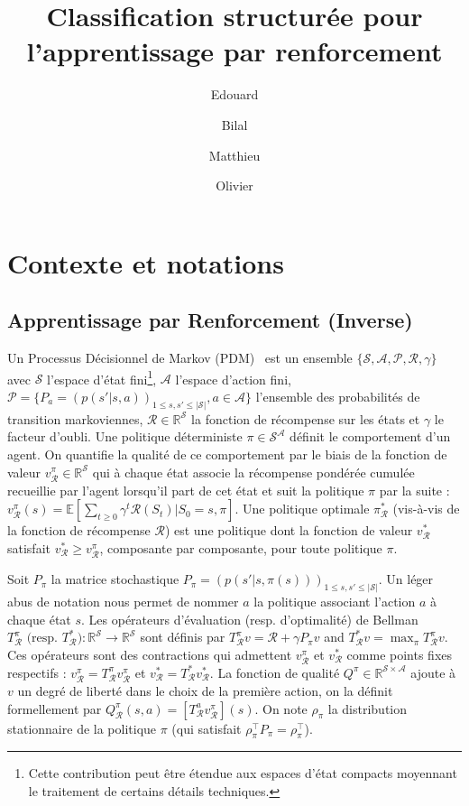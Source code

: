 \documentclass[english,utf8]{./hermes-journal}
\title[SCIRL]{Classification structurée pour l'apprentissage par renforcement}
\author[1,2]{Edouard}{Klein}
\author[2]{Bilal}{Piot}
\author[2,3]{Matthieu}{Geist}
\author[2,3]{Olivier}{Pietquin}
\newcommand{\p}{\mathcal{P}}
\newcommand{\R}{\mathcal{R}}
\newcommand{\s}{\mathcal{S}}
\newcommand{\A}{\mathcal{A}}
\newcommand{\E}{\mathbb{E}}
\begin{document}
\newtheorem{prop}[theorem]{Proposition}
\maketitle

\newpage

\section{Contexte et notations}
\label{sec:background}

\subsection{Apprentissage par Renforcement (Inverse)}
\label{subsec:background:irl}

Un Processus Décisionnel de Markov (PDM)~\cite{Puterman:1994} est un ensemble $\{\s,\A,\p,\R,\gamma\}$ avec $\s$ l'espace d'état fini\footnote{Cette contribution peut être étendue aux espaces d'état compacts moyennant le traitement de certains détails techniques.}, $\A$ l'espace d'action fini, $\p =
\{P_a = (p(s'|s,a))_{1\leq s,s'\leq |\s|}, a\in\A\}$ l'ensemble des probabilités de transition markoviennes, $\R\in\mathbb{R}^\s$ la fonction de récompense sur les états et $\gamma$ le facteur d'oubli.
Une politique déterministe $\pi\in\s^\A$ définit le comportement d'un agent. On quantifie la qualité de ce comportement par le biais de la fonction de valeur $v_\R^\pi\in\mathbb{R}^\s$ qui à chaque état associe la récompense pondérée cumulée recueillie par l'agent lorsqu'il part de cet état et suit la politique $\pi$ par la suite : $v_\R^\pi(s) = \E[\sum_{t\geq 0} \gamma^t \R(S_t)|S_0=s,\pi]$. Une politique optimale $\pi_\R^*$ (vis-à-vis de la fonction de récompense $\R$) est une politique dont la fonction de valeur $v^*_\R$ satisfait $v_\R^* \geq v_\R^\pi$, composante par composante, pour toute politique $\pi$.

Soit $P_\pi$ la matrice stochastique $P_\pi =
(p(s'|s,\pi(s)))_{1\leq s,s'\leq |\s|}$. Un léger abus de notation nous permet de nommer $a$ la politique associant l'action $a$ à chaque état $s$. Les opérateurs d'évaluation (resp. d'optimalité) de Bellman $T^\pi_\R\text{ (resp. $T^*_\R$)}:\mathbb{R}^\s
\rightarrow \mathbb{R}^\s$ sont définis par $T^\pi_\R v = \R + \gamma
P_\pi v$ and $T_\R^*v = \max_\pi T_\R^\pi v$.
Ces opérateurs sont des contractions qui admettent $v_\R^\pi$ et $v^*_\R$ comme points fixes respectifs : $v_\R^\pi = T^\pi_\R v_\R^\pi$ et $v^*_\R = T^*_\R v^*_\R$.
La fonction de qualité $Q^\pi\in\mathbb{R}^{\s\times \A}$ ajoute à $v$ un degré de liberté dans le choix de la première action, on la définit formellement par $Q_\R^\pi(s,a)
= [T^a_\R v^\pi_\R](s)$. On note $\rho_\pi$ la distribution stationnaire de la politique $\pi$ (qui satisfait $\rho_\pi^\top P_\pi = \rho_\pi^\top$).
\end{document}
